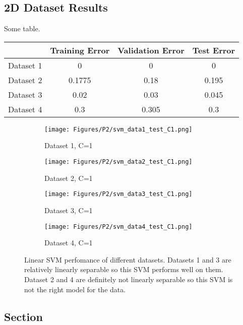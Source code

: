 \documentclass[10pt,twoside]{article}
\begin{document}
\noindent 

\subsection{2D Dataset Results}

Some table. 
\begin{center}
 \begin{tabular}{||c c c c||} 
 \hline
  & Training Error & Validation Error & Test Error \\ [0.5ex] 
 \hline\hline
 Dataset 1 & 0 & 0 & 0 \\ 
 \hline
 Dataset 2 & 0.1775 & 0.18 & 0.195 \\
 \hline
 Dataset 3 & 0.02 & 0.03 & 0.045 \\
 \hline
 Dataset 4 & 0.3 & 0.305 & 0.3 \\
 \hline
\end{tabular}
\end{center}

\begin{figure}[h]
        \begin{subfigure}[b]{0.25\textwidth}
                \centering
                \texttt{[image: Figures/P2/svm\_data1\_test\_C1.png]}
                \caption{Dataset 1, C=1}
        \end{subfigure}%
        \begin{subfigure}[b]{0.25\textwidth}
                \centering
                \texttt{[image: Figures/P2/svm\_data2\_test\_C1.png]}
                \caption{Dataset 2, C=1}
        \end{subfigure}%
        \begin{subfigure}[b]{0.25\textwidth}
                \centering
                \texttt{[image: Figures/P2/svm\_data3\_test\_C1.png]}
                \caption{Dataset 3, C=1}
        \end{subfigure}%
        \begin{subfigure}[b]{0.25\textwidth}
                \centering
                \texttt{[image: Figures/P2/svm\_data4\_test\_C1.png]}
                \caption{Dataset 4, C=1}
        \end{subfigure}
        \caption{Linear SVM perfomance of different datasets. Datasets 1 and 3 are relatively linearly separable so this SVM performs well on them. Dataset 2 and 4 are definitely not linearly separable so this SVM is not the right model for the data.}\label{fig:animals}
\end{figure}

\subsection{Section}


\vfill
\end{document}
